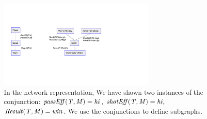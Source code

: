  	 				 	 					
 	 				 	 					\begin{figure}[t]
 	 				 	 						\centering
 	 				 	 						\includegraphics[width=0.7\textwidth] 
 	 				 	 						{figures/instancesofNetwork.pdf}
 	 				 	 						\caption{In the network representation, We have shown two instances of the conjunction: $\it{passEff(T,M)=hi}$, $\it{shotEff(T,M)=hi},$ $\it{Result(T,M)=win}$. We use the conjunctions to define subgraphs.  
 	 				 	 							\label{fig:graphical_represetnaion}
 	 				 	 						}
 	 				 	 					\end{figure}
 	 				
 	 				
